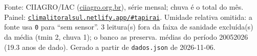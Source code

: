 \documentclass[10pt,a4paper]{article}
\begin{document}
\vspace{1pt}
{\tiny\color{cinza}
Fonte: CIIAGRO/IAC (\href{http://ciiagro.org.br}{ciiagro.org.br}), série mensal;
chuva é o total do mês. Painel:
\href{https://climalitoralsul.netlify.app/\#tapirai}%
{\texttt{climalitoralsul.netlify.app/\#tapirai}}.
Umidade relativa omitida: a fonte usa \texttt{0} para ``sem sensor''.  3 leitura(s) fora da faixa de sanidade excluída(s) da média (tmin 2, chuva 1); o banco as preserva.
médias do período 2005\textendash{}2026 (19.3 anos de dado).
Gerado a partir de \texttt{dados.json} de 2026-11-06.}
\end{document}
